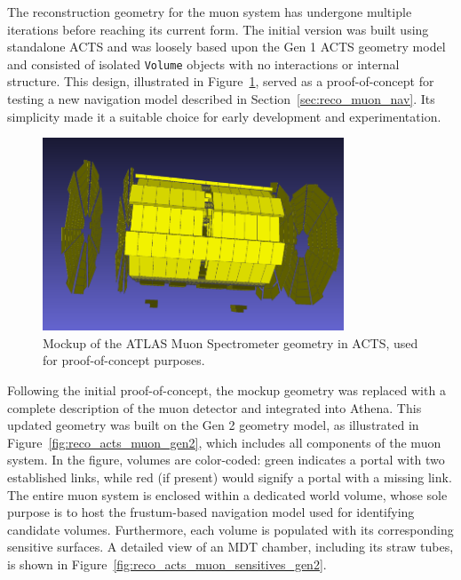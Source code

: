 The reconstruction geometry for the muon system has undergone multiple iterations before reaching its current form. The initial version was built using standalone ACTS and was loosely based upon the Gen 1 ACTS geometry model and consisted of isolated \texttt{Volume} objects with no interactions or internal structure. This design, illustrated in Figure~\ref{fig:reco_acts_muon_mockup}, served as a proof-of-concept for testing a new navigation model described in Section~\ref{sec:reco_muon_nav}. Its simplicity made it a suitable choice for early development and experimentation.

\begin{figure}[htp]
  \centering
  \includegraphics[width=0.8\textwidth]{figures/reco/reco_acts_muon_mockup.png}
  \caption{Mockup of the ATLAS Muon Spectrometer geometry in ACTS, used for proof-of-concept purposes.}\label{fig:reco_acts_muon_mockup}
\end{figure}

Following the initial proof-of-concept, the mockup geometry was replaced with a complete description of the muon detector and integrated into Athena. This updated geometry was built on the Gen 2 geometry model, as illustrated in Figure~\ref{fig:reco_acts_muon_gen2}, which includes all components of the muon system. In the figure, volumes are color-coded: green indicates a portal with two established links, while red (if present) would signify a portal with a missing link. The entire muon system is enclosed within a dedicated world volume, whose sole purpose is to host the frustum-based navigation model used for identifying candidate volumes. Furthermore, each volume is populated with its corresponding sensitive surfaces. A detailed view of an MDT chamber, including its straw tubes, is shown in Figure~\ref{fig:reco_acts_muon_sensitives_gen2}.

